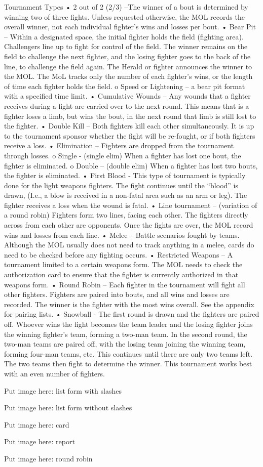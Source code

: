 \documentclass{article}
\begin{document}
Tournament Types
• 2 out of 2 (2/3) –The winner of a bout is determined by winning two of three fights. Unless requested
otherwise, the MOL records the overall winner, not each individual fighter’s wins and losses per bout.
• Bear Pit – Within a designated space, the initial fighter holds the field (fighting area). Challengers
line up to fight for control of the field. The winner remains on the field to challenge the next fighter,
and the losing fighter goes to the back of the line, to challenge the field again. The Herald or fighter
announces the winner to the MOL. The MoL tracks only the number of each fighter’s wins, or the
length of time each fighter holds the field.
o Speed or Lightening – a bear pit format with a specified time limit.
• Cumulative Wounds – Any wounds that a fighter receives during a fight are carried over to the next
round. This means that is a fighter loses a limb, but wins the bout, in the next round that limb is still
lost to the fighter.
• Double Kill – Both fighters kill each other simultaneously. It is up to the tournament sponsor whether
the fight will be re-fought, or if both fighters receive a loss.
• Elimination – Fighters are dropped from the tournament through losses.
o Single - (single elim) When a fighter has lost one bout, the fighter is eliminated.
o Double – (double elim) When a fighter has lost two bouts, the fighter is eliminated.
• First Blood - This type of tournament is typically done for the light weapons fighters. The fight
continues until the “blood” is drawn, (I.e., a blow is received in a non-fatal area such as an arm or leg).
The fighter receives a loss when the wound is fatal.
• Line tournament – (variation of a round robin) Fighters form two lines, facing each other. The
fighters directly across from each other are opponents. Once the fights are over, the MOL record wins
and losses from each line.
• Melee – Battle scenarios fought by teams. Although the MOL usually does not need to track anything
in a melee, cards do need to be checked before any fighting occurs.
• Restricted Weapons – A tournament limited to a certain weapons form. The MOL needs to check the
authorization card to ensure that the fighter is currently authorized in that weapons form.
• Round Robin – Each fighter in the tournament will fight all other fighters. Fighters are paired into
bouts, and all wins and losses are recorded. The winner is the fighter with the most wins overall. See
the appendix for pairing lists.
• Snowball - The first round is drawn and the fighters are paired off. Whoever wins the fight becomes
the team leader and the losing fighter joins the winning fighter’s team, forming a two-man team. In the
second round, the two-man teams are paired off, with the losing team joining the winning team,
forming four-man teams, etc. This continues until there are only two teams left. The two teams then
fight to determine the winner. This tournament works best with an even number of fighters.

Put image here: list form with slashes

Put image here: list form without slashes

Put image here: card

Put image here: report

Put image here: round robin
\end{document}
